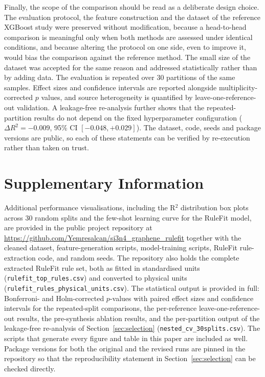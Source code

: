 \documentclass[pdflatex,sn-mathphys-num]{sn-jnl}%
\newif\ifrevmarks%
\newcommand{\revmark}[1]{\ifrevmarks\textcolor{revblue}{#1}\else#1\fi}%
\theoremstyle{thmstyleone}%
\theoremstyle{thmstyletwo}%
\theoremstyle{thmstylethree}%
\begin{document}
\revmark{Finally, the scope of the comparison should be read as a deliberate design choice. The evaluation protocol, the feature construction and the dataset of the reference XGBoost study were preserved without modification, because a head-to-head comparison is meaningful only when both methods are assessed under identical conditions, and because altering the protocol on one side, even to improve it, would bias the comparison against the reference method. The small size of the dataset was accepted for the same reason and addressed statistically rather than by adding data. The evaluation is repeated over 30 partitions of the same samples. Effect sizes and confidence intervals are reported alongside multiplicity-corrected $p$ values, and source heterogeneity is quantified by leave-one-reference-out validation. A leakage-free re-analysis further shows that the repeated-partition results do not depend on the fixed hyperparameter configuration ($\Delta R^2 = -0.009$, 95\% CI $[-0.048, +0.029]$). The dataset, code, seeds and package versions are public, so each of these statements can be verified by re-execution rather than taken on trust.}

\section{Supplementary Information}

\revmark{Additional performance visualisations, including the R$^2$ distribution box plots across 30 random splits and the few-shot learning curve for the RuleFit model, are provided in the public project repository at \url{https://github.com/Yemresalcan/si3n4_graphene_rulefit} together with the cleaned dataset, feature-generation scripts, model-training scripts, RuleFit rule-extraction code, and random seeds. The repository also holds the complete extracted RuleFit rule set, both as fitted in standardised units (\texttt{rulefit\_top\_rules.csv}) and converted to physical units (\texttt{rulefit\_rules\_physical\_units.csv}). The statistical output is provided in full: Bonferroni- and Holm-corrected $p$-values with paired effect sizes and confidence intervals for the repeated-split comparisons, the per-reference leave-one-reference-out results, the pre-synthesis ablation results, and the per-partition output of the leakage-free re-analysis of Section~\ref{sec:selection} (\texttt{nested\_cv\_30splits.csv}). The scripts that generate every figure and table in this paper are included as well. Package versions for both the original and the revised runs are pinned in the repository so that the reproducibility statement in Section~\ref{sec:selection} can be checked directly.}
\end{document}
